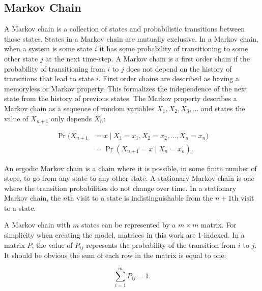 \subsection{Markov Chain}


A Markov chain is a collection of states and probabilistic transitions between those states.
States in a Markov chain are mutually exclusive.
In a Markov chain, when a system is some state $i$ it has some probability of transitioning to some other state $j$ at the next time-step.
A Markov chain is a first order chain if the probability of transitioning from $i$ to $j$ does not depend on the history of transitions that lead to state $i$.
First order chains are described as having a memoryless or Markov property.
This formalizes the independence of the next state from the history of previous states.
The Markov property describes a Markov chain as a sequence of random variables $X_{1}, X_{2}, X_{3}, ...$ and states the value of $X_{n+1}$ only depends $X_{n}$: \cite{MARKOV3}

\begin{align} \Pr(X_{n+1}&=x\mid X_1=x_1, X_2=x_2, \ldots, X_n=x_n)
\nonumber \\ &= \Pr(X_{n+1}=x\mid X_n=x_n). \end{align}

An ergodic Markov chain is a chain where it is possible, in some finite number of steps, to go from any state to any other state.
A stationary Markov chain is one where the transition probabilities do not change over time.
In a stationary Markov chain, the $n$th visit to a state is indistinguishable from the $n+1$th visit to a state.

A Markov chain with $m$ states can be represented by a $m\times m$ matrix.
For simplicity when creating the model, matrices in this work are 1-indexed.
In a matrix $P$, the value of $P_{ij}$ represents the probability of the transition from $i$ to $j$.
It should be obvious the sum of each row in the matrix is equal to one:

\begin{equation} \sum_{i=1}^{m} P_{ij} = 1. \end{equation}

